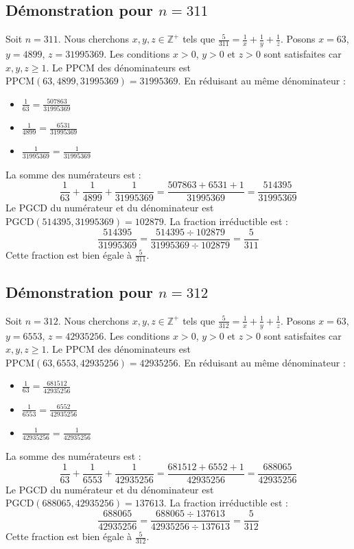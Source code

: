 \documentclass[11pt,a4paper]{article}
\begin{document}
\subsection{Démonstration pour $n = 311$}
Soit $n = 311$. Nous cherchons $x, y, z \in \mathbb{Z}^{+}$ tels que $\frac{5}{311} = \frac{1}{x} + \frac{1}{y} + \frac{1}{z}$.
Posons $x = 63$, $y = 4899$, $z = 31995369$.
Les conditions $x > 0$, $y > 0$ et $z > 0$ sont satisfaites car $x, y, z \geq 1$.
Le PPCM des dénominateurs est $\text{PPCM}(63, 4899, 31995369) = 31995369$.
En réduisant au même dénominateur :
\begin{itemize}
    \item $\frac{1}{63} = \frac{507863}{31995369}$
    \item $\frac{1}{4899} = \frac{6531}{31995369}$
    \item $\frac{1}{31995369} = \frac{1}{31995369}$
\end{itemize}
La somme des numérateurs est :
$$ \frac{1}{63} + \frac{1}{4899} + \frac{1}{31995369} = \frac{507863 + 6531 + 1}{31995369} = \frac{514395}{31995369} $$
Le PGCD du numérateur et du dénominateur est $\text{PGCD}(514395, 31995369) = 102879$.
La fraction irréductible est :
$$ \frac{514395}{31995369} = \frac{514395 \div 102879}{31995369 \div 102879} = \frac{5}{311} $$
Cette fraction est bien égale à $\frac{5}{311}$.

\subsection{Démonstration pour $n = 312$}
Soit $n = 312$. Nous cherchons $x, y, z \in \mathbb{Z}^{+}$ tels que $\frac{5}{312} = \frac{1}{x} + \frac{1}{y} + \frac{1}{z}$.
Posons $x = 63$, $y = 6553$, $z = 42935256$.
Les conditions $x > 0$, $y > 0$ et $z > 0$ sont satisfaites car $x, y, z \geq 1$.
Le PPCM des dénominateurs est $\text{PPCM}(63, 6553, 42935256) = 42935256$.
En réduisant au même dénominateur :
\begin{itemize}
    \item $\frac{1}{63} = \frac{681512}{42935256}$
    \item $\frac{1}{6553} = \frac{6552}{42935256}$
    \item $\frac{1}{42935256} = \frac{1}{42935256}$
\end{itemize}
La somme des numérateurs est :
$$ \frac{1}{63} + \frac{1}{6553} + \frac{1}{42935256} = \frac{681512 + 6552 + 1}{42935256} = \frac{688065}{42935256} $$
Le PGCD du numérateur et du dénominateur est $\text{PGCD}(688065, 42935256) = 137613$.
La fraction irréductible est :
$$ \frac{688065}{42935256} = \frac{688065 \div 137613}{42935256 \div 137613} = \frac{5}{312} $$
Cette fraction est bien égale à $\frac{5}{312}$.
\end{document}
